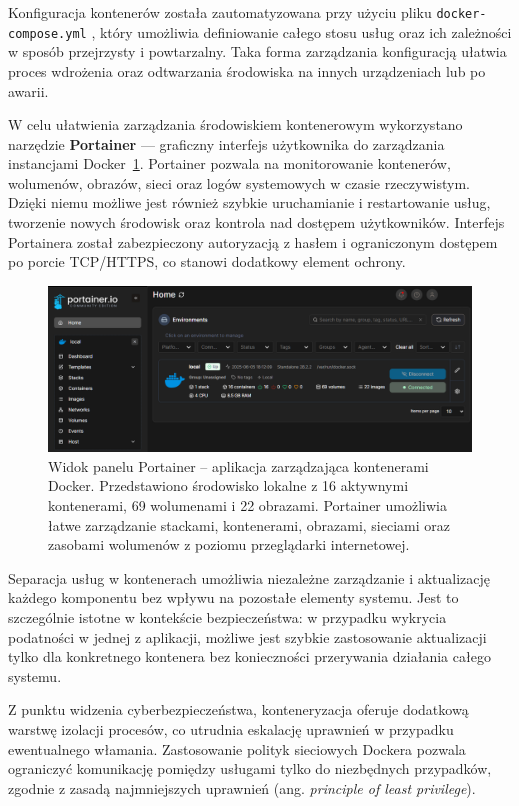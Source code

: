 \documentclass[
    left=2.5cm,         %
    right=2.5cm,        %
    top=2.5cm,          %
    bottom=3cm,         %
    bindingoffset=6mm,  %
    nohyphenation=true %
]{eiti/eiti-thesis} %
\begin{document}
Konfiguracja kontenerów została zautomatyzowana przy użyciu pliku \texttt{docker-compose.yml} \cite{lukaszfd_dockercompose2024}, który umożliwia definiowanie całego stosu usług oraz ich zależności w sposób przejrzysty i powtarzalny. Taka forma zarządzania konfiguracją ułatwia proces wdrożenia oraz odtwarzania środowiska na innych urządzeniach lub po awarii.

W celu ułatwienia zarządzania środowiskiem kontenerowym wykorzystano narzędzie \textbf{Portainer} — graficzny interfejs użytkownika do zarządzania instancjami Docker~\ref{fig:portainer-dashboard}. Portainer pozwala na monitorowanie kontenerów, wolumenów, obrazów, sieci oraz logów systemowych w czasie rzeczywistym. Dzięki niemu możliwe jest również szybkie uruchamianie i restartowanie usług, tworzenie nowych środowisk oraz kontrola nad dostępem użytkowników. Interfejs Portainera został zabezpieczony autoryzacją z hasłem i ograniczonym dostępem po porcie TCP/HTTPS, co stanowi dodatkowy element ochrony.
\begin{figure}[H]
    \centering
    \includegraphics[width=\textwidth]{img/portainer.png}
    \caption{Widok panelu Portainer – aplikacja zarządzająca kontenerami Docker. Przedstawiono środowisko lokalne z 16 aktywnymi kontenerami, 69 wolumenami i 22 obrazami. Portainer umożliwia łatwe zarządzanie stackami, kontenerami, obrazami, sieciami oraz zasobami wolumenów z poziomu przeglądarki internetowej.}
    \label{fig:portainer-dashboard}
\end{figure}


Separacja usług w kontenerach umożliwia niezależne zarządzanie i aktualizację każdego komponentu bez wpływu na pozostałe elementy systemu. Jest to szczególnie istotne w kontekście bezpieczeństwa: w przypadku wykrycia podatności w jednej z aplikacji, możliwe jest szybkie zastosowanie aktualizacji tylko dla konkretnego kontenera bez konieczności przerywania działania całego systemu.

Z punktu widzenia cyberbezpieczeństwa, konteneryzacja oferuje dodatkową warstwę izolacji procesów, co utrudnia eskalację uprawnień w przypadku ewentualnego włamania. Zastosowanie polityk sieciowych Dockera pozwala ograniczyć komunikację pomiędzy usługami tylko do niezbędnych przypadków, zgodnie z zasadą najmniejszych uprawnień (ang. \textit{principle of least privilege}).
\end{document}
